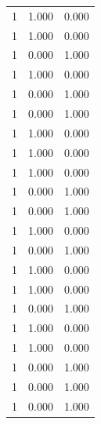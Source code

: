 \begin{tabular}{rrr}
1 & 1.000 & 0.000 \\
1 & 1.000 & 0.000 \\
1 & 0.000 & 1.000 \\
1 & 1.000 & 0.000 \\
1 & 0.000 & 1.000 \\
1 & 0.000 & 1.000 \\
1 & 1.000 & 0.000 \\
1 & 1.000 & 0.000 \\
1 & 1.000 & 0.000 \\
1 & 0.000 & 1.000 \\
1 & 0.000 & 1.000 \\
1 & 1.000 & 0.000 \\
1 & 0.000 & 1.000 \\
1 & 1.000 & 0.000 \\
1 & 1.000 & 0.000 \\
1 & 0.000 & 1.000 \\
1 & 1.000 & 0.000 \\
1 & 1.000 & 0.000 \\
1 & 0.000 & 1.000 \\
1 & 0.000 & 1.000 \\
1 & 0.000 & 1.000 \\
\bottomrule
\end{tabular}
